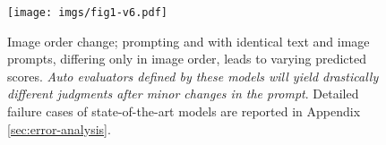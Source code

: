 \begin{figure}[ht]
    \centering
    \texttt{[image: imgs/fig1-v6.pdf]}
    \vspace{-0.5cm} %
    \caption{Image order change; prompting \gptFouroEleven{} and \geminiPro{} with identical text and image prompts, differing only in image order, leads to varying predicted scores. \emph{Auto evaluators defined by these models will yield drastically different judgments after minor changes in the prompt}. Detailed failure cases of state-of-the-art models are reported in Appendix \ref{sec:error-analysis}.}
    \label{fig:fig1}
\end{figure}